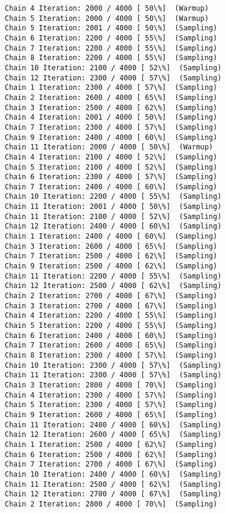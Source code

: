\documentclass[11pt]{article}
\begin{document}
\begin{Verbatim}[commandchars=\\\{\}]
Chain 4 Iteration: 2000 / 4000 [ 50\%]  (Warmup)
Chain 5 Iteration: 2000 / 4000 [ 50\%]  (Warmup)
Chain 5 Iteration: 2001 / 4000 [ 50\%]  (Sampling)
Chain 6 Iteration: 2200 / 4000 [ 55\%]  (Sampling)
Chain 7 Iteration: 2200 / 4000 [ 55\%]  (Sampling)
Chain 8 Iteration: 2200 / 4000 [ 55\%]  (Sampling)
Chain 10 Iteration: 2100 / 4000 [ 52\%]  (Sampling)
Chain 12 Iteration: 2300 / 4000 [ 57\%]  (Sampling)
Chain 1 Iteration: 2300 / 4000 [ 57\%]  (Sampling)
Chain 2 Iteration: 2600 / 4000 [ 65\%]  (Sampling)
Chain 3 Iteration: 2500 / 4000 [ 62\%]  (Sampling)
Chain 4 Iteration: 2001 / 4000 [ 50\%]  (Sampling)
Chain 7 Iteration: 2300 / 4000 [ 57\%]  (Sampling)
Chain 9 Iteration: 2400 / 4000 [ 60\%]  (Sampling)
Chain 11 Iteration: 2000 / 4000 [ 50\%]  (Warmup)
Chain 4 Iteration: 2100 / 4000 [ 52\%]  (Sampling)
Chain 5 Iteration: 2100 / 4000 [ 52\%]  (Sampling)
Chain 6 Iteration: 2300 / 4000 [ 57\%]  (Sampling)
Chain 7 Iteration: 2400 / 4000 [ 60\%]  (Sampling)
Chain 10 Iteration: 2200 / 4000 [ 55\%]  (Sampling)
Chain 11 Iteration: 2001 / 4000 [ 50\%]  (Sampling)
Chain 11 Iteration: 2100 / 4000 [ 52\%]  (Sampling)
Chain 12 Iteration: 2400 / 4000 [ 60\%]  (Sampling)
Chain 1 Iteration: 2400 / 4000 [ 60\%]  (Sampling)
Chain 3 Iteration: 2600 / 4000 [ 65\%]  (Sampling)
Chain 7 Iteration: 2500 / 4000 [ 62\%]  (Sampling)
Chain 9 Iteration: 2500 / 4000 [ 62\%]  (Sampling)
Chain 11 Iteration: 2200 / 4000 [ 55\%]  (Sampling)
Chain 12 Iteration: 2500 / 4000 [ 62\%]  (Sampling)
Chain 2 Iteration: 2700 / 4000 [ 67\%]  (Sampling)
Chain 3 Iteration: 2700 / 4000 [ 67\%]  (Sampling)
Chain 4 Iteration: 2200 / 4000 [ 55\%]  (Sampling)
Chain 5 Iteration: 2200 / 4000 [ 55\%]  (Sampling)
Chain 6 Iteration: 2400 / 4000 [ 60\%]  (Sampling)
Chain 7 Iteration: 2600 / 4000 [ 65\%]  (Sampling)
Chain 8 Iteration: 2300 / 4000 [ 57\%]  (Sampling)
Chain 10 Iteration: 2300 / 4000 [ 57\%]  (Sampling)
Chain 11 Iteration: 2300 / 4000 [ 57\%]  (Sampling)
Chain 3 Iteration: 2800 / 4000 [ 70\%]  (Sampling)
Chain 4 Iteration: 2300 / 4000 [ 57\%]  (Sampling)
Chain 5 Iteration: 2300 / 4000 [ 57\%]  (Sampling)
Chain 9 Iteration: 2600 / 4000 [ 65\%]  (Sampling)
Chain 11 Iteration: 2400 / 4000 [ 60\%]  (Sampling)
Chain 12 Iteration: 2600 / 4000 [ 65\%]  (Sampling)
Chain 1 Iteration: 2500 / 4000 [ 62\%]  (Sampling)
Chain 6 Iteration: 2500 / 4000 [ 62\%]  (Sampling)
Chain 7 Iteration: 2700 / 4000 [ 67\%]  (Sampling)
Chain 10 Iteration: 2400 / 4000 [ 60\%]  (Sampling)
Chain 11 Iteration: 2500 / 4000 [ 62\%]  (Sampling)
Chain 12 Iteration: 2700 / 4000 [ 67\%]  (Sampling)
Chain 2 Iteration: 2800 / 4000 [ 70\%]  (Sampling)

\end{Verbatim}
\end{document}

